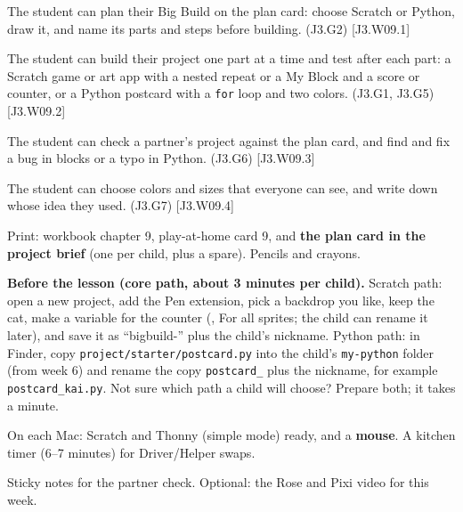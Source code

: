 
\begin{objectives}
  \item The student can plan their Big Build on the plan card: choose Scratch or Python, draw it, and name its parts and steps before building. (J3.G2) [J3.W09.1]
  \item The student can build their project one part at a time and test after each part: a Scratch game or art app with a nested repeat or a My Block and a score or counter, or a Python postcard with a \texttt{for} loop and two colors. (J3.G1, J3.G5) [J3.W09.2]
  \item The student can check a partner's project against the plan card, and find and fix a bug in blocks or a typo in Python. (J3.G6) [J3.W09.3]
  \item The student can choose colors and sizes that everyone can see, and write down whose idea they used. (J3.G7) [J3.W09.4]
\end{objectives}

\begin{materials}
  \item Print: workbook chapter 9, play-at-home card 9, and \textbf{the plan card in the project brief} (one per child, plus a spare). Pencils and crayons.
  \item \textbf{Before the lesson (core path, about 3 minutes per child).} Scratch path: open a new project, add the Pen extension, pick a backdrop you like, keep the cat, make a variable for the counter (, For all sprites; the child can rename it later), and save it as \enquote{bigbuild-} plus the child's nickname. Python path: in Finder, copy \texttt{project/starter/postcard.py} into the child's \texttt{my-python} folder (from week 6) and rename the copy \texttt{postcard\_} plus the nickname, for example \texttt{postcard\_kai.py}. Not sure which path a child will choose? Prepare both; it takes a minute.
  \item On each Mac: Scratch and Thonny (simple mode) ready, and a \textbf{mouse}. A kitchen timer (6--7 minutes) for Driver/Helper swaps.
  \item Sticky notes for the partner check. Optional: the Rose and Pixi video for this week.
\end{materials}

